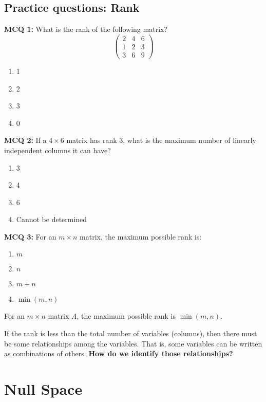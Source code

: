 \documentclass[11pt,a4paper]{article}
\theoremstyle{definition}
\begin{document}
\subsection{Practice questions: Rank}

\textbf{MCQ 1:} What is the rank of the following matrix?
\[\begin{pmatrix}
2 & 4 & 6 \\
1 & 2 & 3 \\
3 & 6 & 9
\end{pmatrix}\]

\begin{enumerate}
    \item 1
    \item 2
    \item 3
    \item 0
\end{enumerate}
\newpage

\noindent \textbf{MCQ 2:} If a $4 \times 6$ matrix has rank 3, what is the maximum number of linearly independent columns it can have?

\begin{enumerate}
    \item 3
    \item 4
    \item 6
    \item Cannot be determined
\end{enumerate}

\noindent \textbf{MCQ 3:} For an $m \times n$ matrix, the maximum possible rank is:

\begin{enumerate}
    \item $m$
    \item $n$
    \item $m + n$
    \item $\min(m, n)$
\end{enumerate}

\begin{defbox}
For an $m \times n$ matrix $A$, the maximum possible rank is $\min(m, n)$.
\end{defbox}

\noindent If the rank is less than the total number of variables (columns), then there must be some relationships among the variables. 
That is, some variables can be written as combinations of others.
\textbf{How do we identify those relationships?}

\section{Null Space}
\end{document}
